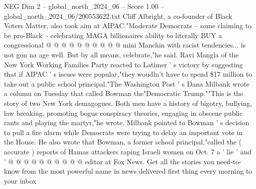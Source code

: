 \begin{textsample}{NEG Dim 2 – global\_north\_2024\_06 – Score 1.00 – global\_north\_2024\_06/200553622.txt}
Cliff Albright, a co-founder of Black Voters Matter, also took aim at AIPAC."Moderate Democrats -- some claiming to be pro-Black -- celebrating MAGA billionaires ability to literally BUY a congressional @ @ @ @ @ @ @ @ @ @ mini Manchin with racist tendencies... is not gon na age well.
But by all means, celebrate,"he said.
Ravi Mangla of the New York Working Families Party reacted to Latimer ' s victory by suggesting that if AIPAC ' s issues were popular,"they woudln't have to spend \$17 million to take out a public school principal."The Washington Post ' s Dana Milbank wrote a column on Tuesday that called Bowman the"Democratic Trump.""This is the story of two New York demagogues.
Both men have a history of bigotry, bullying, law breaking, promoting bogus conspiracy theories, engaging in obscene public rants and playing the martyr,"he wrote.
Milbank pointed to Bowman ' s decision to pull a fire alarm while Democrats were trying to delay an important vote in the House.
He also wrote that Bowman, a former school principal,"called the ( accurate ) reports of Hamas attackers raping Israeli women on Oct. 7 a ' lie ' and ' @ @ @ @ @ @ @ @ @ @ editor at Fox News.
Get all the stories you need-to-know from the most powerful name in news delivered first thing every morning to your inbox

\end{textsample}
